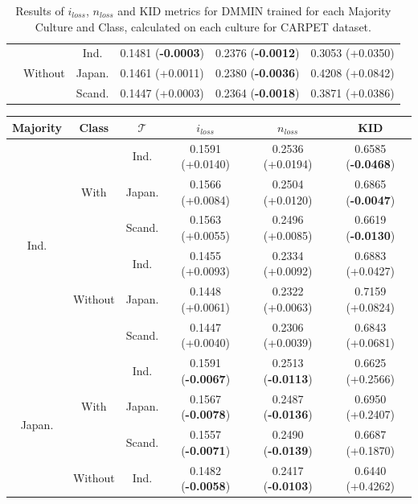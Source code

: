 \begin{table}[H]
\begin{tabular}{c|c|c|c|c|c}
\hhline{~-----}
 & \multirow{3}{*}{Without} &Ind.     & 0.1481 (\textbf{-0.0003})       & 0.2376 (\textbf{-0.0012})       & 0.3053 (+0.0350)   \\
 &  & Japan.   & 0.1461 (+0.0011)       & 0.2380 (\textbf{-0.0036})       & 0.4208 (+0.0842)    \\
 &  & Scand. & 0.1447 (+0.0003)       & 0.2364 (\textbf{-0.0018})       & 0.3871 (+0.0386) \\
\bottomrule
    \end{tabular}
    \caption{Results of $i_{loss}$, $n_{loss}$ and KID metrics for DMMIN trained for each Majority Culture and Class, calculated on each culture for CARPET dataset.}
    \label{ch3:tab:ris:dmmin:carpet}
\end{table}
%
%
\begin{table}[H]
\centering
\small
\begin{tabular}{c|c|c|c|c|c}
    \textbf{Majority} & \textbf{Class} & \textbf{$\mathcal{T}$} & \textbf{$i_{loss}$} & \textbf{$n_{loss}$} & \textbf{KID} \\
    \toprule
\multirow{6}{*}{Ind.} & \multirow{3}{*}{With} & Ind.     & 0.1591 (+0.0140)       & 0.2536 (+0.0194)       & 0.6585 (\textbf{-0.0468}) \\
 &  & Japan.   & 0.1566 (+0.0084)       & 0.2504 (+0.0120)       & 0.6865 (\textbf{-0.0047})   \\
 &  & Scand. & 0.1563 (+0.0055)       & 0.2496 (+0.0085)       & 0.6619 (\textbf{-0.0130})  \\
\hhline{~-----}
 & \multirow{3}{*}{Without} & Ind.     & 0.1455 (+0.0093)       & 0.2334 (+0.0092)       & 0.6883 (+0.0427) \\
 &  & Japan.   & 0.1448 (+0.0061)       & 0.2322 (+0.0063)       & 0.7159 (+0.0824) \\
 &  & Scand. & 0.1447 (+0.0040)       & 0.2306 (+0.0039)       & 0.6843 (+0.0681)  \\
\midrule
\multirow{6}{*}{Japan.} & \multirow{3}{*}{With} & Ind.     & 0.1591 (\textbf{-0.0067})       & 0.2513 (\textbf{-0.0113})       & 0.6625 (+0.2566)  \\
 &  & Japan.   & 0.1567 (\textbf{-0.0078})       & 0.2487 (\textbf{-0.0136})       & 0.6950 (+0.2407)  \\
 &  & Scand. & 0.1557 (\textbf{-0.0071})       & 0.2490 (\textbf{-0.0139})       & 0.6687 (+0.1870)  \\
\hhline{~-----}
 & \multirow{3}{*}{Without} & Ind.     & 0.1482 (\textbf{-0.0058})       & 0.2417 (\textbf{-0.0103})       & 0.6440 (+0.4262) \\

\end{tabular}
\end{table}
